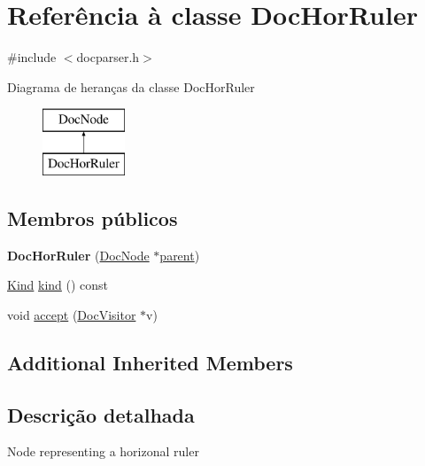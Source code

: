 \hypertarget{class_doc_hor_ruler}{\section{Referência à classe Doc\-Hor\-Ruler}
\label{class_doc_hor_ruler}
}


{\ttfamily \#include $<$docparser.\-h$>$}

Diagrama de heranças da classe Doc\-Hor\-Ruler\begin{figure}[H]
\begin{center}
\leavevmode
\includegraphics[height=2.000000cm]{class_doc_hor_ruler}
\end{center}
\end{figure}
\subsection*{Membros públicos}
\begin{DoxyCompactItemize}
\item 
\hypertarget{class_doc_hor_ruler_a254a9b2b4c17c3a91460dc639413e80d}{{\bfseries Doc\-Hor\-Ruler} (\hyperlink{class_doc_node}{Doc\-Node} $\ast$\hyperlink{class_doc_node_abd7f070d6b0a38b4da71c2806578d19d}{parent})}\label{class_doc_hor_ruler_a254a9b2b4c17c3a91460dc639413e80d}

\item 
\hyperlink{class_doc_node_aa10c9e8951b8ccf714a59ec321bdac5b}{Kind} \hyperlink{class_doc_hor_ruler_aa9d037bed9f9a083d0cd01485637d843}{kind} () const 
\item 
void \hyperlink{class_doc_hor_ruler_a7ba716e854ae2f8f87a4eb2140e302b6}{accept} (\hyperlink{class_doc_visitor}{Doc\-Visitor} $\ast$v)
\end{DoxyCompactItemize}
\subsection*{Additional Inherited Members}


\subsection{Descrição detalhada}
Node representing a horizonal ruler 


